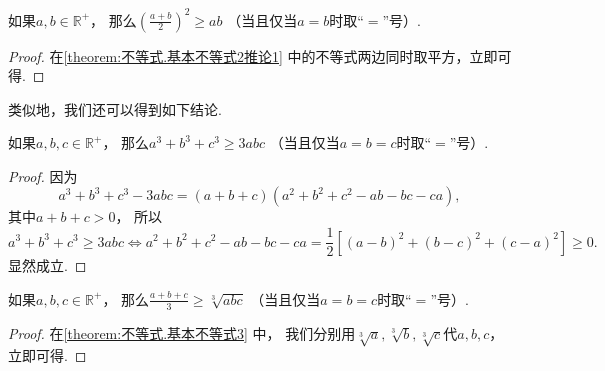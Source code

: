 \begin{corollary}\label{theorem:不等式.基本不等式2推论2}
如果\(a,b\in\mathbb{R}^+\)，
那么\(\left(\frac{a+b}2\right)^2 \geq ab\)
（当且仅当\(a=b\)时取“\(=\)”号）.
\begin{proof}
在\cref{theorem:不等式.基本不等式2推论1} 中的不等式两边同时取平方，立即可得.
\end{proof}
\end{corollary}

类似地，我们还可以得到如下结论.
\begin{theorem}\label{theorem:不等式.基本不等式3}
如果\(a,b,c\in\mathbb{R}^+\)，
那么\(a^3 + b^3 + c^3 \geq 3abc\)
（当且仅当\(a=b=c\)时取“\(=\)”号）.
\begin{proof}
因为\[
	a^3+b^3+c^3-3abc
	= (a+b+c)(a^2+b^2+c^2-ab-bc-ca),
\]
其中\(a+b+c>0\)，
所以\[
	a^3 + b^3 + c^3 \geq 3abc
	\iff
	a^2+b^2+c^2-ab-bc-ca
	= \frac12 \left[
		(a-b)^2+(b-c)^2+(c-a)^2
	\right]
	\geq 0.
\]
显然成立.
\end{proof}
\end{theorem}

\begin{corollary}\label{theorem:不等式.基本不等式3推论}
如果\(a,b,c\in\mathbb{R}^+\)，
那么\(\frac{a+b+c}{3} \geq \sqrt[3]{abc}\)
（当且仅当\(a=b=c\)时取“\(=\)”号）.
\begin{proof}
在\cref{theorem:不等式.基本不等式3} 中，
我们分别用\(\sqrt[3]{a},\sqrt[3]{b},\sqrt[3]{c}\)代\(a,b,c\)，
立即可得.
\end{proof}
\end{corollary}

